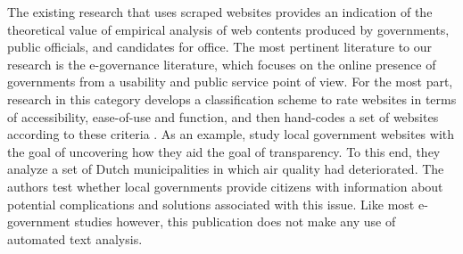 \documentclass[11pt]{article}
\begin{document}
The existing research that uses scraped websites provides an indication of the theoretical value of empirical analysis of web contents produced by governments, public officials, and candidates for office. The most pertinent literature to our research is the e-governance literature, which focuses on the online presence of governments from a usability and public service point of view. For the most part, research in this category develops a classification scheme to rate websites in terms of accessibility, ease-of-use and function, and then hand-codes a set of websites according to these criteria \citep[e.g., ][]{Urban2002,Armstrong2011,Feeney2017}. As an example, \cite{grimmelikhuijsen2012developing} study local government websites with the goal of uncovering how they aid the goal of transparency. To this end, they analyze a set of Dutch municipalities in which air quality had deteriorated. The authors test whether local governments provide citizens with information about potential complications and solutions associated with this issue. Like most e-government studies however, this publication does not make any use of automated text analysis.
\end{document}
